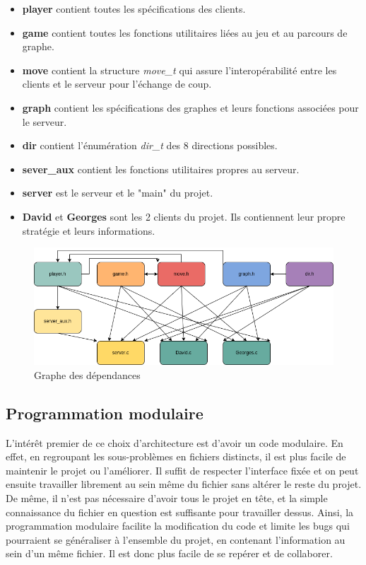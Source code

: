 \documentclass{article}
\begin{document}
\begin{itemize}
    \item \textbf{player} contient toutes les spécifications des clients.
    \item \textbf{game} contient toutes les fonctions utilitaires liées au jeu et au parcours de graphe.
    \item \textbf{move} contient la structure \textit{move\_t} qui assure l'interopérabilité entre les clients et le serveur pour l'échange de coup.
    \item \textbf{graph} contient les spécifications des graphes et leurs fonctions associées pour le serveur.
    \item \textbf{dir} contient l'énumération \textit{dir\_t} des 8 directions possibles.
    \item \textbf{sever\_aux} contient les fonctions utilitaires propres au serveur.
    \item \textbf{server} est le serveur et le "main" du projet.
    \item \textbf{David} et \textbf{Georges} sont les 2 clients du projet. Ils contiennent leur propre stratégie et leurs informations.
\end{itemize}

\begin{figure}[!h]
    \centering
    \includegraphics[width=12cm]{diag_c.drawio.png}
    \caption{Graphe des dépendances}
    \label{fig:depend}
\end{figure}

\subsection{Programmation modulaire}
L’intérêt premier de ce choix d’architecture est d’avoir un code modulaire. En effet, en regroupant les sous-problèmes en fichiers distincts, il est plus facile de maintenir le projet ou l’améliorer. Il
suffit de respecter l’interface fixée et on peut ensuite travailler librement au sein même du fichier
sans altérer le reste du projet. De même, il n’est pas nécessaire d’avoir tous le projet en tête, et la
simple connaissance du fichier en question est suffisante pour travailler dessus.
Ainsi, la programmation modulaire facilite la modification du code et limite les bugs qui pourraient se généraliser à l’ensemble du projet, en contenant l’information au sein d’un même fichier. Il est
donc plus facile de se repérer et de collaborer.
\end{document}
